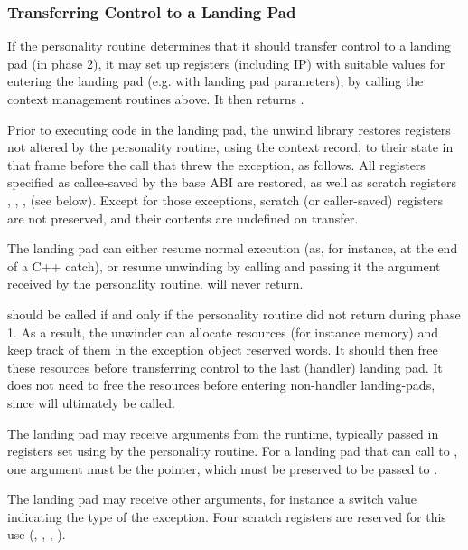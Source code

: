 \subsubsection{Transferring Control to a Landing Pad}

If the personality routine determines that it should transfer control to a
landing pad (in phase 2), it may set up registers (including IP) with
suitable values for entering the landing pad (e.g. with landing pad
parameters), by calling the context management routines above. It then
returns .

Prior to executing code in the landing pad, the unwind library restores
registers not altered by the personality routine, using the context
record, to their state in that frame before the call that threw the exception,
as follows. All registers specified as callee-saved by the base ABI are
restored, as well as scratch registers \RDI, \RSI, \RDX, \RCX (see below).
Except for those exceptions, scratch (or caller-saved) registers are not
preserved, and their contents are undefined on transfer.

The landing pad can either resume normal execution (as, for instance, at
the end of a C++ catch), or resume unwinding by calling  and
passing it the  argument received by the personality routine.
 will never return.

 should be called if and only if the personality routine
did not return  during phase 1.  As a result,
the unwinder can allocate resources (for instance memory) and keep track
of them in the exception object reserved words. It should then free these
resources before transferring control to the last (handler) landing pad.
It does not need to free the resources before entering non-handler
landing-pads, since  will ultimately be called.

The landing pad may receive arguments from the runtime, typically passed
in registers set using  by the personality routine.
For a landing pad that can call to , one argument must
be the  pointer, which must be preserved to be passed to
.

The landing pad may receive other arguments, for instance a switch value
indicating the type of the exception. Four scratch registers are reserved
for this use (\RDI, \RSI, \RDX, \RCX).

